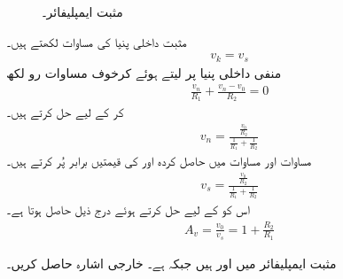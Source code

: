 \begin{figure}
\centering
{}
\caption{مثبت ایمپلیفائر۔}
\label{شکل_حسابی_مثبت_ایمپلیفائر}
\end{figure}
مثبت داخلی پنیا کی مساوات لکھتے ہیں۔
\begin{align}\label{مساوات_حسابی_مثبت_ایمپلیفائر_الف}
v_k=v_s
\end{align}
منفی داخلی پنیا پر  لیتے ہوئے  کرخوف مساوات رو لکھ
\begin{align*}
\frac{v_n}{R_1}+\frac{v_n-v_0}{R_2}=0
\end{align*}
کر  کے لیے حل کرتے ہیں۔
\begin{align}\label{مساوات_حسابی_مثبت_ایمپلیفائر_ب}
v_n=\frac{\frac{v_0}{R_2}}{\frac{1}{R_1}+\frac{1}{R_2}}
\end{align}
مساوات  اور مساوات  میں حاصل کردہ  اور  کی قیمتیں برابر پُر کرتے ہیں۔
\begin{align*}
v_s=\frac{\frac{v_0}{R_2}}{\frac{1}{R_1}+\frac{1}{R_2}}
\end{align*}
اس کو  کے لیے حل کرتے ہوئے درج ذیل حاصل ہوتا ہے۔
\begin{align}\label{مساوات_حسابی_مثبت_ایمپلیفائر_افزائش}
A_v=\frac{v_0}{v_s}=1+\frac{R_2}{R_1}
\end{align}

مثبت ایمپلیفائر میں  اور  ہیں جبکہ  ہے۔ خارجی اشارہ حاصل کریں۔

